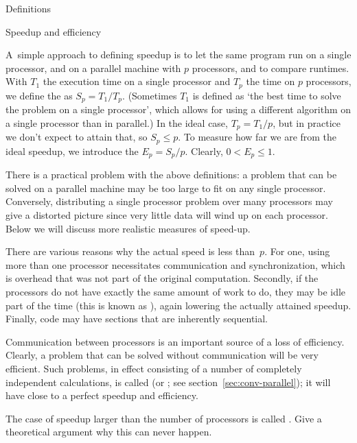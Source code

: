  {Definitions}
\label{sec:speedup}

 {Speedup and efficiency}

A~simple approach to defining speedup is to let the same program run on a
single processor, and on a parallel machine with $p$ processors, and
to compare runtimes.
With $T_1$ the execution time on a single processor and
$T_p$ the time on $p$ processors, we define the  as
$S_p=T_1/T_p$. (Sometimes $T_1$ is defined as `the best time to solve the
problem on a single processor', which allows for using a different
algorithm on a single processor than in parallel.)
In the ideal case, $T_p=T_1/p$, but in practice we don't expect to
attain that, so $S_p\leq p$. To measure how far we are from the ideal
speedup, we introduce the  $E_p=S_p/p$. Clearly,
$0< E_p\leq 1$.

There is a practical problem with
the above definitions: a problem that can be solved on a parallel machine
may be too large to fit on any single processor. Conversely,
distributing a single processor problem
over many processors may give a distorted picture since very little
data will wind up on each processor. Below we will discuss more
realistic measures of speed-up.

There are various reasons why the actual speed is less than~$p$. For
one, using more than one processor necessitates communication
and synchronization, which
is overhead that was not part of the original computation. Secondly,
if the processors do not have exactly the same amount of work to do,
they may be idle part of the time (this is known as
), again lowering the actually attained
speedup. Finally, code may have sections that are inherently
sequential.

Communication between processors is an important source of a loss of
efficiency. Clearly, a problem that can be solved without
communication will be very efficient. Such problems, in effect
consisting of a number of completely independent calculations, is
called 
(or ; see section~\ref{sec:conv-parallel});
it will have close to a perfect speedup and efficiency.

\begin{exercise}
  The case of speedup larger than the number of processors is called
  . Give a theoretical argument why
  this can never happen.
\end{exercise}

